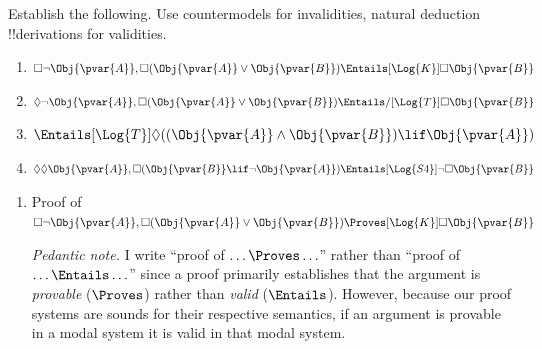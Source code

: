\documentclass[../../../include/open-logic-section]{subfiles}
\begin{document}
\begin{prob}
\begin{ans}
\clearpage
\end{ans}

\end{prob}

\begin{prob}
    Establish the following. Use countermodels for invalidities, 
    natural deduction !!{derivation}s for validities. 
    \begin{enumerate}
        \item $\Box\lnot\Obj{\pvar{A}}, 
        \Box(\Obj{\pvar{A}}\lor\Obj{\pvar{B}})
        \Entails[\Log{K}] \Box{\Obj{\pvar{B}}}$

        \item $\Diamond\lnot\Obj{\pvar{A}}, 
        \Box(\Obj{\pvar{A}}\lor\Obj{\pvar{B}})
        \Entails/[\Log{T}] \Box{\Obj{\pvar{B}}}$

        \item $\Entails[\Log{T}]\Diamond(
            (\Obj{\pvar{A}}\land\Obj{\pvar{B}})\lif\Obj{\pvar{A}})$

        \item $\Diamond\Diamond \Obj{\pvar{A}},
        \Box(\Obj{\pvar{B}}\lif\lnot\Obj{\pvar{A}})
        \Entails[\Log{S4}] \lnot\Box\Obj{\pvar{B}}$
    
    \end{enumerate}

    \begin{ans}
    \begin{enumerate}
        \item Proof of $\Box\lnot\Obj{\pvar{A}}, 
        \Box(\Obj{\pvar{A}}\lor\Obj{\pvar{B}})
        \Proves[\Log{K}] \Box{\Obj{\pvar{B}}}$

        \begin{prooftree}
        \end{prooftree}

        \emph{Pedantic note.} I write ``proof of
        $\ldots\Proves\ldots$'' rather than ``proof of
        $\ldots\Entails\ldots$'' since a proof primarily establishes
        that the argument is \emph{provable} ($\Proves$) rather than
        \emph{valid} ($\Entails$). However, because our proof systems are
        sounds for their respective semantics, if an argument is provable 
        in a modal system it is valid in that modal system.


\end{enumerate}
\end{ans}
\end{prob}
\end{document}
